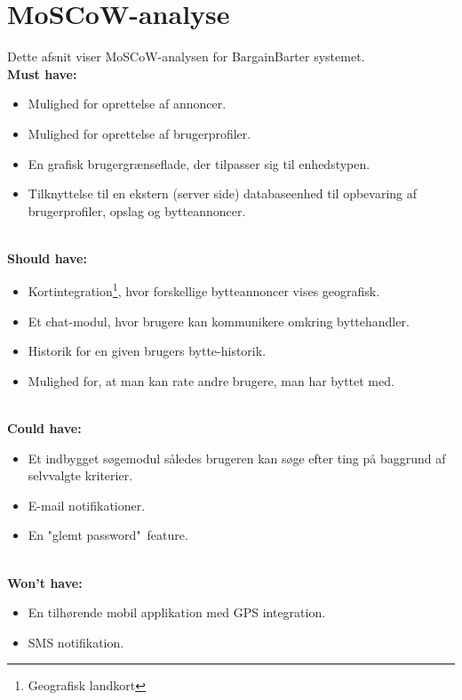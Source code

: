 \chapter{MoSCoW-analyse}\label{ch:Moscow}
Dette afsnit viser MoSCoW-analysen for BargainBarter systemet. \\
\textbf{Must have:}
\begin{itemize}[noitemsep]
	\item Mulighed for oprettelse af annoncer.
	\item Mulighed for oprettelse af brugerprofiler.
	\item En grafisk brugergrænseflade, der tilpasser sig til enhedstypen.
	\item Tilknyttelse til en ekstern (server side) databaseenhed til opbevaring af brugerprofiler, opslag og bytteannoncer.
	
\end{itemize}

\textbf{\\Should have:}
\begin{itemize}[noitemsep]
	\item Kortintegration\footnote{Geografisk landkort}, hvor forskellige bytteannoncer vises geografisk.
	\item Et chat-modul, hvor brugere kan kommunikere omkring byttehandler.
	\item Historik for en given brugers bytte-historik.
	\item Mulighed for, at man kan rate andre brugere, man har byttet med.
\end{itemize}

\textbf{\\Could have:}
\begin{itemize}[noitemsep]
	\item Et indbygget søgemodul således brugeren kan søge efter ting på baggrund af selvvalgte kriterier.
	\item E-mail notifikationer.
	\item En "glemt password"\ feature.
\end{itemize}

\textbf{\\Won't have:}
\begin{itemize}[noitemsep]
	\item En tilhørende mobil applikation med GPS integration.
	\item SMS notifikation.
\end{itemize}
